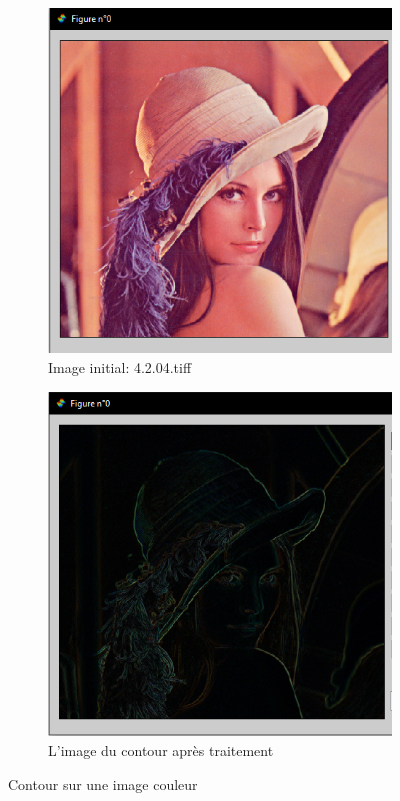 \documentclass[12pt, letterpaper]{article}
\begin{document}
\begin{figure}[h!]
    \centering
    \begin{subfigure}[b]{0.7\linewidth}
      \includegraphics[width=\linewidth]{img/fig3.PNG}
      \caption{Image initial: 4.2.04.tiff}
    \end{subfigure}
    \begin{subfigure}[b]{0.7\linewidth}
      \includegraphics[width=\linewidth]{img/fig4.PNG}
      \caption{L'image du contour après traitement}
    \end{subfigure}
    \caption{Contour sur une image couleur}
    \label{fig:contour1}
\end{figure}
\end{document}
